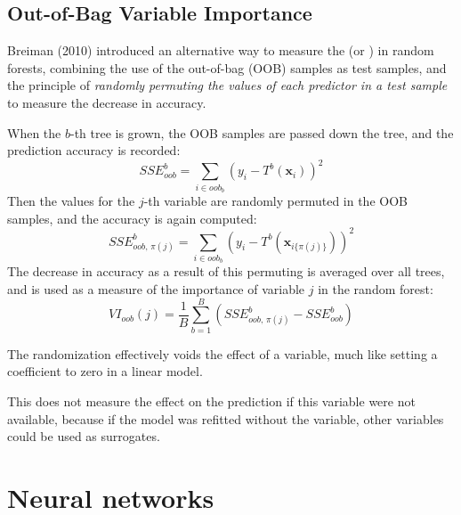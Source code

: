 \subsection{Out-of-Bag Variable Importance}

Breiman (2010) introduced an alternative way to measure the 
(or ) in random forests, combining the use
of the out-of-bag (OOB) samples as test samples, and the principle of
\emph{randomly permuting the values of each predictor in a test sample}
to measure the decrease in accuracy.

\begin{algorithm}{}{}
	When the $b$-th tree is grown, the OOB samples are passed down the tree, and the prediction
	accuracy is recorded:
	\begin{equation*}
		SSE_{oob}^b = \sum_{i \in oob_b} \left( y_i - T^b(\boldsymbol x_i) \right)^2
	\end{equation*}
	Then the values for the $j$-th variable are randomly permuted in the OOB samples,
	and the accuracy is again computed:
	\begin{equation*}
		SSE_{oob,\,\pi(j)}^b = \sum_{i \in oob_b} \left( y_i - T^b(\boldsymbol x_{i\{\pi(j)\}}) \right)^2
	\end{equation*}
	The decrease in accuracy as a result of this permuting is averaged over all trees, and is used
	as a measure of the importance of variable $j$ in the random forest:
	\begin{equation*}
		VI_{oob}(j) = \frac{1}{B}\sum_{b=1}^B \left( SSE_{oob,\,\pi(j)}^b - SSE_{oob}^b \right)
	\end{equation*}

	\tcblower

	The randomization effectively voids the effect of a variable, much like setting a coefficient
	to zero in a linear model.

	\begin{note}
		This does not measure the effect on the prediction if this variable
		were not available, because if the model was refitted without the variable,
		other variables could be used as surrogates.
	\end{note}
\end{algorithm}

\section{Neural networks}

